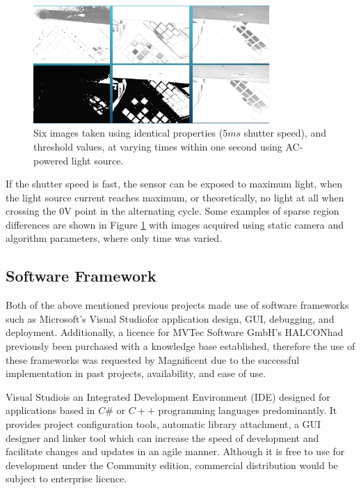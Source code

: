 \documentclass[fleqn,twoside,12pt]{report}
\begin{document}
\begin{figure}[h]
	\centering
	\includegraphics[width=0.8\textwidth]{flicker.png}
	\caption{Six images taken using identical properties ($5ms$ shutter speed), and threshold values, at varying times within one second using AC-powered light source.}
	\label{fig:flicker}
\end{figure}





If the shutter speed is fast, the sensor can be exposed to maximum light, when the light source current reaches maximum, or theoretically, no light at all when crossing the 0V point in the alternating cycle. Some examples of sparse region differences are shown in Figure \ref{fig:flicker} with images acquired using static camera and algorithm parameters, where only time was varied.


\subsection{Software Framework}

Both of the above mentioned previous projects made use of software frameworks such as Microsoft's Visual Studio\textregistered for application design, GUI, debugging, and deployment. Additionally, a licence for MVTec Software GmbH's HALCON\texttrademark had previously been purchased with a knowledge base established, therefore the use of these frameworks was requested by Magnificent due to the successful implementation in past projects, availability, and ease of use.

Visual Studio\textregistered is an Integrated Development Environment (IDE) designed for applications based in $C\#$ or $C++$ programming languages predominantly. It provides project configuration tools, automatic library attachment, a GUI designer and linker tool which can increase the speed of development and facilitate changes and updates in an agile manner. Although it is free to use for development under the Community edition, commercial distribution would be subject to enterprise licence. 
\end{document}
